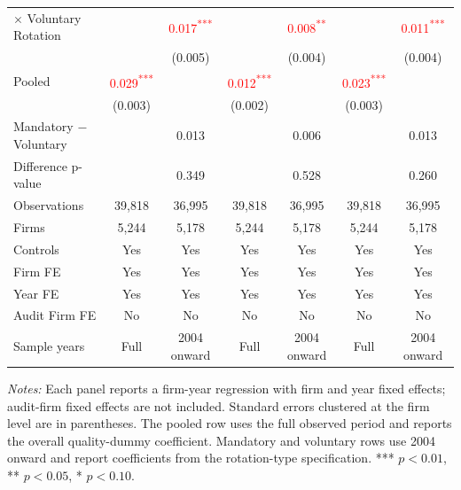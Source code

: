 \documentclass[10pt]{article}
\newcommand{\sym}[1]{\textsuperscript{#1}}
\begin{document}
\begin{minipage}{19cm}
\begin{threeparttable}
\begin{tabular}{l cc cc cc}
$\times$ Voluntary Rotation &  & \textcolor{red}{0.017\sym{***}} &  & \textcolor{red}{0.008\sym{**}} &  & \textcolor{red}{0.011\sym{***}} \\
 &  & (0.005) &  & (0.004) &  & (0.004) \\
Pooled & \textcolor{red}{0.029\sym{***}} &  & \textcolor{red}{0.012\sym{***}} &  & \textcolor{red}{0.023\sym{***}} &  \\
 & (0.003) &  & (0.002) &  & (0.003) &  \\
Mandatory $-$ Voluntary &  & 0.013 &  & 0.006 &  & 0.013 \\
Difference p-value &  & 0.349 &  & 0.528 &  & 0.260 \\
Observations & 39,818 & 36,995 & 39,818 & 36,995 & 39,818 & 36,995 \\
Firms & 5,244 & 5,178 & 5,244 & 5,178 & 5,244 & 5,178 \\
\midrule
Controls & Yes & Yes & Yes & Yes & Yes & Yes \\
Firm FE & Yes & Yes & Yes & Yes & Yes & Yes \\
Year FE & Yes & Yes & Yes & Yes & Yes & Yes \\
Audit Firm FE & No & No & No & No & No & No \\
Sample years & Full & 2004 onward & Full & 2004 onward & Full & 2004 onward \\
\bottomrule
\end{tabular}
\begin{tablenotes}\fontsize{9}{11}\selectfont
\item \fontsize{9}{11}\selectfont \textit{Notes:} Each panel reports a firm-year regression with firm and year fixed effects; audit-firm fixed effects are not included. Standard errors clustered at the firm level are in parentheses. The pooled row uses the full observed period and reports the overall quality-dummy coefficient. Mandatory and voluntary rows use 2004 onward and report coefficients from the rotation-type specification. *** \(p<0.01\), ** \(p<0.05\), * \(p<0.10\).
\end{tablenotes}
\end{threeparttable}

\end{minipage}
\end{document}
